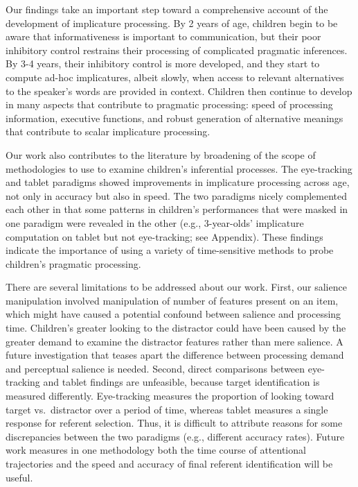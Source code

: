 \documentclass[a4paper,man,apacite,floatsintext]{apa6}
\begin{document}
Our findings take an important step toward a comprehensive account of
the development of implicature processing. By 2 years of age, children
begin to be aware that informativeness is important to communication,
but their poor inhibitory control restrains their processing of
complicated pragmatic inferences. By 3-4 years, their inhibitory control
is more developed, and they start to compute ad-hoc implicatures, albeit
slowly, when access to relevant alternatives to the speaker's words are
provided in context. Children then continue to develop in many aspects
that contribute to pragmatic processing: speed of processing
information, executive functions, and robust generation of alternative
meanings that contribute to scalar implicature processing.

Our work also contributes to the literature by broadening of the scope
of methodologies to use to examine children's inferential processes. The
eye-tracking and tablet paradigms showed improvements in implicature
processing across age, not only in accuracy but also in speed. The two
paradigms nicely complemented each other in that some patterns in
children's performances that were masked in one paradigm were revealed
in the other (e.g., 3-year-olds' implicature computation on tablet but
not eye-tracking; see Appendix). These findings indicate the importance
of using a variety of time-sensitive methods to probe children's
pragmatic processing.

There are several limitations to be addressed about our work. First, our
salience manipulation involved manipulation of number of features
present on an item, which might have caused a potential confound between
salience and processing time. Children's greater looking to the
distractor could have been caused by the greater demand to examine the
distractor features rather than mere salience. A future investigation
that teases apart the difference between processing demand and
perceptual salience is needed. Second, direct comparisons between
eye-tracking and tablet findings are unfeasible, because target
identification is measured differently. Eye-tracking measures the
proportion of looking toward target vs.~distractor over a period of
time, whereas tablet measures a single response for referent selection.
Thus, it is difficult to attribute reasons for some discrepancies
between the two paradigms (e.g., different accuracy rates). Future work
measures in one methodology both the time course of attentional
trajectories and the speed and accuracy of final referent identification
will be useful.
\end{document}

